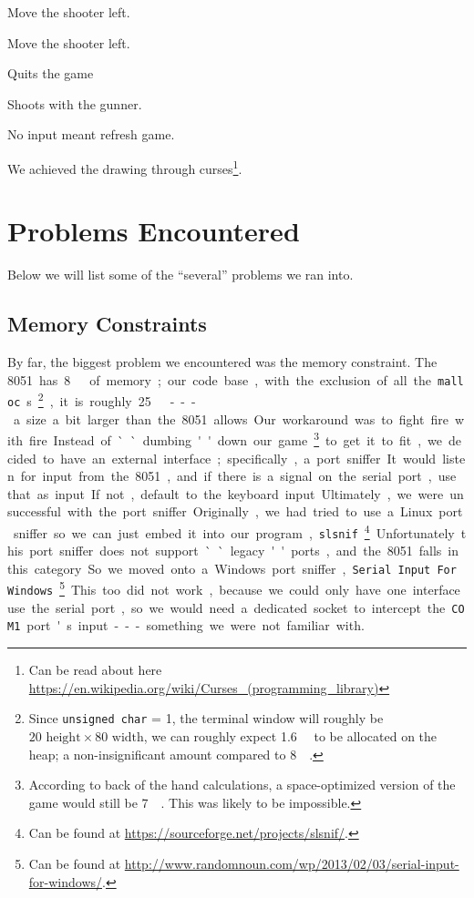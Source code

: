 \documentclass[12pt]{article}
\newcommand{\shellcmd}[1]{\texttt{\colorbox{gray!30}{#1}}}
\begin{document}
\begin{description}
    \item[\keys{\arrowkeyleft}] Move the shooter left.
    \item[\keys{\arrowkeyright}] Move the shooter left.
    \item[] Quits the game
    \item[\keys{\SPACE}] Shoots with the gunner.
    \item{\keys{ }} No input meant refresh game.
\end{description}

We achieved the drawing through curses\footnote{Can be read about here \url{https://en.wikipedia.org/wiki/Curses_(programming_library)}}.

\section{Problems Encountered}
Below we will list some of the ``several'' problems we ran into.

\subsection{Memory Constraints}
By far, the biggest problem we encountered was the memory constraint. The \SI{8051} has \SI{8}{\kilo\byte} of memory; our code base, with the exclusion of all the \shellcmd{malloc}s\footnote{Since \shellcmd{unsigned char} = \SI{1}{\byte}, the terminal window will roughly be $20\text{ height} \times 80\text{ width} $, we can roughly expect \SI{1.6}{\kilo\byte} to be allocated on the heap; a non-insignificant amount compared to \SI{8}{\kilo\byte}.}, it is roughly \SI{25}{\kilo\byte} --- a size a bit larger than the \num{8051} allows. Our workaround was to fight fire with fire.

Instead of ``dumbing'' down our game\footnote{According to back of the hand calculations, a space-optimized version of the game would still be \SI{7}{\kilo\byte}. This was likely to be impossible.} to get it to fit, we decided to have an external interface; specifically, a port sniffer. It would listen for input from the \num{8051}, and if there is a signal on the serial port, use that as input. If not, default to the keyboard input.

Ultimately, we were unsuccessful with the port sniffer. Originally, we had tried to use a Linux port sniffer so we can just embed it into our program, \shellcmd{slsnif}\footnote{Can be found at \url{https://sourceforge.net/projects/slsnif/}.}. Unfortunately this port sniffer does not support ``legacy'' ports, and the \num{8051} falls in this category. So we moved onto a Windows port sniffer, \shellcmd{Serial Input For Windows}\footnote{Can be found at \url{http://www.randomnoun.com/wp/2013/02/03/serial-input-for-windows/}.}. This too did not work, because we could only have one interface use the serial port, so we would need a dedicated socket to intercept the \shellcmd{COM1} port's input --- something we were not familiar with.
\end{document}
